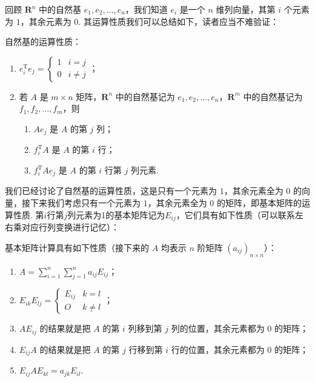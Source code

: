 回顾 $\mathbf{R}^n$ 中的自然基 $e_1,e_2,\ldots,e_n$，我们知道 $e_i$ 是一个 $n$ 维列向量，其第 $i$ 个元素为 $1$，其余元素为 $0$. 其运算性质我们可以总结如下，读者应当不难验证：
\begin{theorem}{}{}
    自然基的运算性质：
    \begin{enumerate}
        \item $e_i^{\mathrm{T}}e_j = \begin{cases}
                      1 & i = j    \\
                      0 & i \neq j
                  \end{cases}$；

        \item 若 $A$ 是 $m \times n$ 矩阵，$\mathbf{R}^n$ 中的自然基记为 $e_1,e_2,\ldots,e_n$，$\mathbf{R}^m$ 中的自然基记为 $f_1,f_2,\ldots,f_m$，则
        \begin{enumerate}
            \item $Ae_j$ 是 $A$ 的第 $j$ 列；
            \item $f_i^{\mathrm{T}}A$ 是 $A$ 的第 $i$ 行；
            \item $f_i^{\mathrm{T}}Ae_j$ 是 $A$ 的第 $i$ 行第 $j$ 列元素.
        \end{enumerate}
    \end{enumerate}
\end{theorem}

我们已经讨论了自然基的运算性质，这是只有一个元素为 $1$，其余元素全为 $0$ 的向量，接下来我们考虑只有一个元素为 $1$，其余元素全为 $0$ 的矩阵，即基本矩阵的运算性质. 第$i$行第$j$列元素为1的基本矩阵记为$E_{ij}$，它们具有如下性质（可以联系左右乘对应行列变换进行记忆）：
\begin{theorem}{}{}
    基本矩阵计算具有如下性质（接下来的 $A$ 均表示 $n$ 阶矩阵 $(a_{ij})_{n \times n}$）：
    \begin{enumerate}
        \item $A = \sum\limits_{i=1}^n\sum\limits_{j=1}^na_{ij}E_{ij}$；
        \item $E_{ik}E_{lj} = \begin{cases}
                      E_{ij} & k = l    \\
                      O      & k \neq l
                  \end{cases}$；
        \item $AE_{ij}$ 的结果就是把 $A$ 的第 $i$ 列移到第 $j$ 列的位置，其余元素都为 $0$ 的矩阵；
        \item $E_{ij}A$ 的结果就是把 $A$ 的第 $j$ 行移到第 $i$ 行的位置，其余元素都为 $0$ 的矩阵；
        \item $E_{ij}AE_{kl} = a_{jk}E_{il}$.
    \end{enumerate}
\end{theorem}

